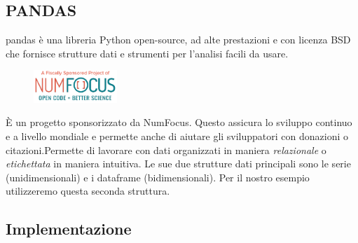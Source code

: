 \documentclass[12pt]{article}
\begin{document}
	\subsection{PANDAS}

		pandas è una libreria Python open-source, ad alte prestazioni e con licenza BSD che fornisce strutture dati e strumenti per l'analisi facili da usare\cite{pandasManual}.
		\begin{figure} %
			\begin{center}
				\includegraphics[width=0.28\textwidth]{numFocus.png}
			\end{center}
		\end{figure}
		\`{E} un progetto sponsorizzato da NumFocus. Questo assicura lo sviluppo continuo e a livello mondiale e permette anche di aiutare gli sviluppatori con donazioni o citazioni.Permette di lavorare con dati organizzati in maniera \emph{relazionale} o \emph{etichettata} in maniera intuitiva. Le sue due strutture dati principali sono le serie (unidimensionali) e i dataframe (bidimensionali). Per il nostro esempio utilizzeremo questa seconda struttura.
		

	\subsection{Implementazione}
	
\end{document}
